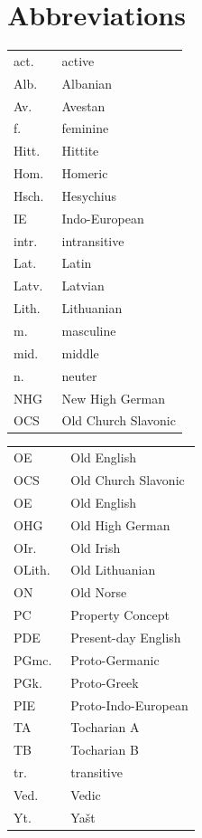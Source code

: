 \documentclass[output=paper,colorlinks,citecolor=brown]{langscibook}
\begin{document}
\section*{Abbreviations}
\begin{tabularx}{.48\textwidth}{lQ}
act.\ & active\\
Alb.\ & Albanian\\
Av.\ & Avestan\\
f.\ & feminine\\
Hitt. & Hittite\\
Hom. & Homeric\\
Hsch. & Hesychius\\
IE & Indo-European\\
intr.\ & intransitive\\
Lat.\ & Latin\\
Latv.\ & Latvian\\
Lith.\  & Lithuanian\\
m.\ & masculine\\ 
mid.\ & middle\\
n.\ & neuter\\
NHG & New High German\\
OCS & Old Church Slavonic\\
\end{tabularx}
\begin{tabularx}{.48\textwidth}{lQ}
OE & Old English\\
OCS & Old Church Slavonic\\
OE & Old English\\
OHG & Old High German\\
OIr.\ & Old Irish\\
OLith.\  & Old Lithuanian\\
ON & Old Norse\\
PC & Property Concept\\
PDE & Present-day English\\ 
PGmc.\ & Proto-Germanic\\
PGk.\ & Proto-Greek\\
PIE & Proto-Indo-European\\
TA & Tocharian A\\
TB & Tocharian B\\
tr. & transitive\\
Ved.\ & Vedic\\
Yt.\ & Yašt\\
\end{tabularx}

\sloppy\printbibliography[heading=subbibliography,notkeyword=this]
\end{document}
